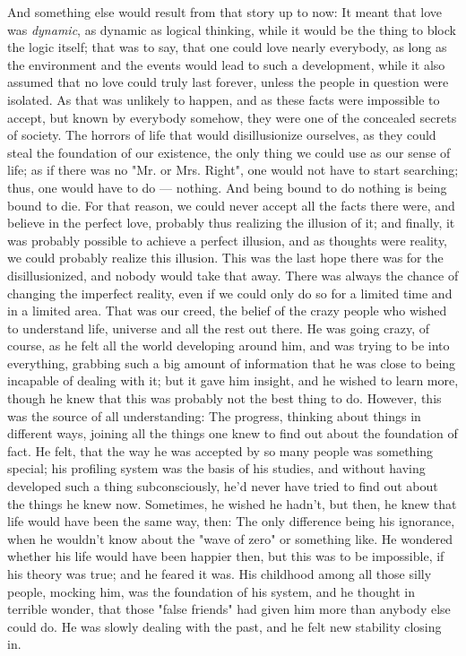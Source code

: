 And something else would result from that story up to now: It meant that love was \emph{dynamic}, as dynamic as logical thinking, while it would be the thing to block the logic itself; that was to say, that one could love nearly everybody, as long as the environment and the events would lead to such a development, while it also assumed that no love could truly last forever, unless the people in question were isolated. As that was unlikely to happen, and as these facts were impossible to accept, but known by everybody somehow, they were one of the concealed secrets of society. The horrors of life that would disillusionize ourselves, as they could steal the foundation of our existence, the only thing we could use as our sense of life; as if there was no "Mr. or Mrs. Right", one would not have to start searching; thus, one would have to do --- nothing. And being bound to do nothing is being bound to die. For that reason, we could never accept all the facts there were, and believe in the perfect love, probably thus realizing the illusion of it; and finally, it was probably possible to achieve a perfect illusion, and as thoughts were reality, we could probably realize this illusion. This was the last hope there was for the disillusionized, and nobody would take that away. 
There was always the chance of changing the imperfect reality, even if we could only do so for a limited time and in a limited area. 
That was our creed, the belief of the crazy people who wished to understand life, universe and all the rest out there. 
He was going crazy, of course, as he felt all the world developing around him, and was trying to be into everything, grabbing such a big amount of information that he was close to being incapable of dealing with it; but it gave him insight, and he wished to learn more, though he knew that this was probably not the best thing to do. However, this was the source of all understanding: The progress, thinking about things in different ways, joining all the things one knew to find out about the foundation of fact. 
He felt, that the way he was accepted by so many people was something special; his profiling system was the basis of his studies, and without having developed such a thing subconsciously, he'd never have tried to find out about the things he knew now. Sometimes, he wished he hadn't, but then, he knew that life would have been the same way, then: The only difference being his ignorance, when he wouldn't know about the "wave of zero" or something like. He wondered whether his life would have been happier then, but this was to be impossible, if his theory was true; and he feared it was. His childhood among all those silly people, mocking him, was the foundation of his system, and he thought in terrible wonder, that those "false friends" had given him more than anybody else could do. He was slowly dealing with the past, and he felt new stability closing in. 
